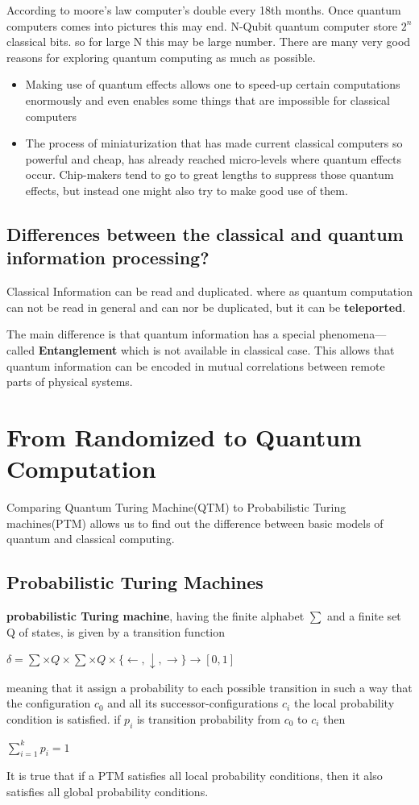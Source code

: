 \documentclass[11 pt]{article}
\theoremstyle{definition}
\theoremstyle{remark}
\begin{document}
According to moore's law computer's double every 18th months. Once quantum computers comes into pictures this may end. N-Qubit quantum computer store $2^n$ classical bits. so for large N this may be large number. There are many very good reasons for exploring quantum computing as much as possible.
\begin{itemize}
\item Making use of quantum effects allows one to speed-up certain computations enormously and even enables some things that are impossible for classical computers
\item The process of miniaturization that has made current classical computers so powerful and cheap, has already reached micro-levels where quantum effects occur. Chip-makers tend to go to great lengths to suppress those quantum effects, but instead one might also try to make good use of them.
\end{itemize}

\subsection{Differences between the classical and quantum information processing?}
Classical Information can be read and duplicated. where as quantum computation can not be read in general and can nor be duplicated, but it can be \textbf{teleported}.

The main difference is that quantum information has a special phenomena—called \textbf{Entanglement} which is not available in classical case. This allows that quantum information can be encoded in mutual correlations between remote parts of physical systems.

\section{From Randomized to Quantum Computation}
Comparing Quantum Turing Machine(QTM) to Probabilistic Turing machines(PTM) allows us to find out the difference between basic models of quantum and classical computing. 

\subsection{Probabilistic Turing Machines}
\textbf{probabilistic Turing machine}, having the finite alphabet $\sum$ and a finite set Q of states, is given by a transition function
\begin{center}
$\delta = \sum \times Q \times \sum \times Q \times \{\leftarrow,\downarrow,\rightarrow\} \longrightarrow [0,1]$
\end{center}
meaning that it assign a probability to each possible transition in such a way that the configuration
$c_0$ and all its successor-configurations $c_i$ the local probability condition is satisfied. if $p_i$ is transition probability from $c_0$ to $c_i$ then
\begin{center}
$\sum_{i=1}^{k}p_i = 1$
\end{center}
It is true that if a PTM satisfies all local probability conditions, then it also satisfies
all global probability conditions.
\end{document}
